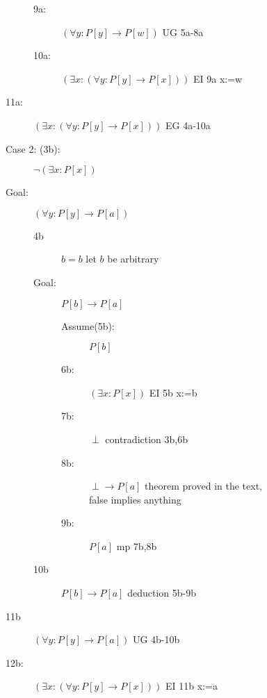 \documentclass[12pt]{book}
\begin{document}
\begin{description}
\begin{description}
\begin{description}
\begin{description}
\begin{description}
\begin{description}
\end{description}

\item[9a:]  $(\forall y:P[y] \rightarrow P[w])$  UG 5a-8a

\item[10a:]  $(\exists x:(\forall y:P[y] \rightarrow P[x]))$  EI 9a x:=w

\end{description}

\item[11a:]  $(\exists x:(\forall y:P[y] \rightarrow P[x]))$  EG 4a-10a

\newpage

\item[Case 2: (3b):]$\neg (\exists x:P[x])$

\item[Goal:]  $(\forall y:P[y] \rightarrow P[a])$

\begin{description}


\item[4b] $b=b$ let $b$ be arbitrary

\item[Goal:]  $P[b] \rightarrow P[a]$

\begin{description}

\item[Assume(5b):]  $P[b]$

\item[6b:]  $(\exists x:P[x])$  EI 5b x:=b

\item[7b:]  $\perp$  contradiction 3b,6b

\item[8b:]  $\perp \rightarrow P[a]$  theorem proved in the text, false implies anything

\item[9b:]  $P[a]$ mp 7b,8b

\end{description}

\item [10b]  $P[b] \rightarrow P[a]$  deduction 5b-9b

\end{description}

\item[11b]  $(\forall y:P[y] \rightarrow P[a])$  UG  4b-10b

\item[12b:]  $(\exists x:(\forall y:P[y] \rightarrow P[x]))$  EI 11b x:=a




\end{description}
\end{description}
\end{description}
\end{description}
\end{document}
